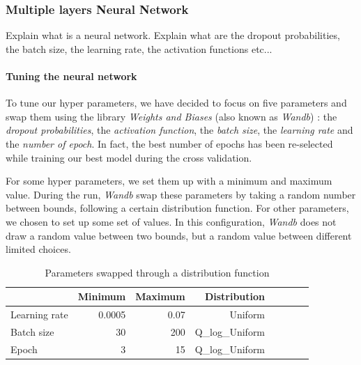 \documentclass[12pt]{article}
\begin{document}
\subsubsection{Multiple layers Neural Network}

\noindent Explain what is a neural network. Explain what are the dropout probabilities, the batch size, the learning rate, the activation functions etc...

\paragraph{Tuning the neural network}

\noindent To tune our hyper parameters, we have decided to focus on five parameters and swap them using the library \textit{Weights and Biases} (also known as \textit{Wandb}) : the \textit{dropout probabilities}, the \textit{activation function}, the \textit{batch size}, the \textit{learning rate} and the \textit{number of epoch}. In fact, the best number of epochs has been re-selected while training our best model during the cross validation.

\noindent For some hyper parameters, we set them up with a minimum and maximum value. During the run, \textit{Wandb} swap these parameters by taking a random number between bounds, following a certain distribution function. For other parameters, we chosen to set up some set of values. In this configuration, \textit{Wandb} does not draw a random value between two bounds, but a random value between different limited choices.


\begin{table}[h]
    \centering
    \caption{Parameters swapped through a distribution function}
    \label{table:Parameters swapped through a distribution function}
    \begin{tabular}{lrrrrrrr}
    \toprule
           & Minimum & Maximum & Distribution \\
    \midrule
     Learning rate & 0.0005 & 0.07 & Uniform  \\
     Batch size & 30 & 200 & Q\_log\_Uniform  \\
     Epoch & 3 & 15 & Q\_log\_Uniform  \\
    \bottomrule
    \end{tabular}
\end{table}
\end{document}
